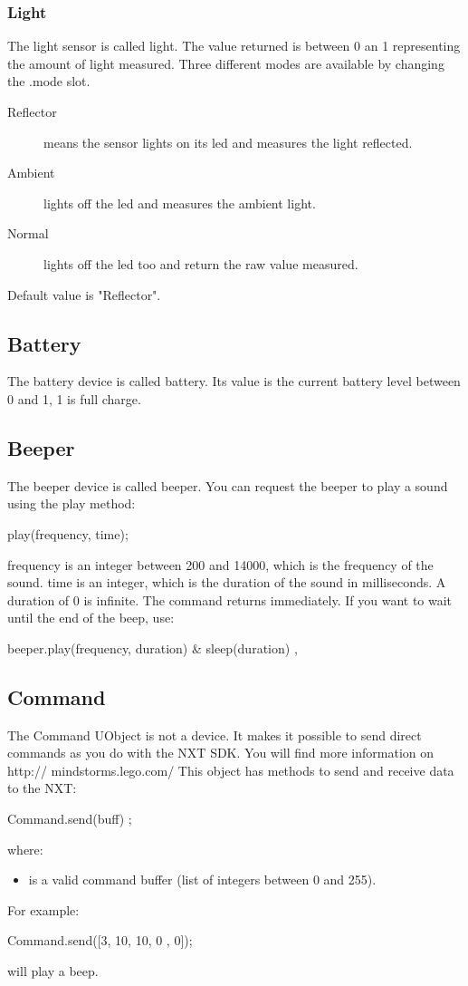 \subsubsection{Light}
The light sensor is called light.
The value returned is between 0 an 1 representing the amount of light measured.
Three different modes are available by changing the .mode slot.
\begin{description}
\item[Reflector] means the sensor lights on its led and measures the light
  reflected.
\item[Ambient] lights off the led and measures the ambient light.
\item[Normal] lights off the led too and return the raw value measured.
\end{description}
Default value is "Reflector".

\subsection{Battery}
The battery device is called battery.
Its value is the current battery level between 0 and 1, 1 is full charge.
\subsection{Beeper}
The beeper device is called beeper.
You can request the beeper to play a sound using the play method:
\begin{urbiunchecked}
  play(frequency, time);
\end{urbiunchecked}

frequency is an integer between 200 and 14000, which is the frequency of the
sound. time is an integer, which is the duration of the sound in milliseconds.
A duration of 0 is infinite.
The command returns immediately. If you want to wait until the end of the beep,
use:
\begin{urbiunchecked}
  { beeper.play(frequency, duration) & sleep(duration) },
\end{urbiunchecked}

\subsection{Command}
The Command UObject is not a device. It makes it possible to send direct
commands as you do with the NXT SDK. You will find more information on http://
mindstorms.lego.com/
This object has methods to send and receive data to the NXT:
\begin{urbiunchecked}
  Command.send(buff) ;
\end{urbiunchecked}
where:
\begin{itemize}
\item {} is a valid command buffer (list of integers between 0 and
  255).
\end{itemize}
For example:
\begin{urbiunchecked}
Command.send([3, 10, 10, 0 , 0]);
\end{urbiunchecked}
will play a beep.



